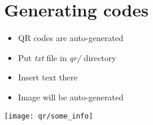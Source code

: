 \section{Generating codes}


{
\begin{itemize}
\item QR codes are auto-generated
\item Put \emph{txt} file in \emph{qr/} directory
\item Insert text there
\item Image will be auto-generated
\end{itemize}

\begin{center}
\texttt{[image: qr/some\_info]}
\end{center}
}
